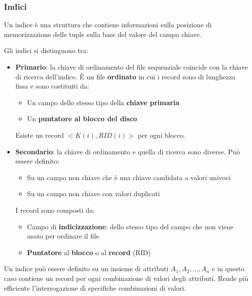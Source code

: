 \subsubsection{Indici}
\begin{definition}[Indice]
	Un indice è una struttura che contiene informazioni sulla posizione di memorizzazione delle tuple sulla base del valore del campo chiave.
\end{definition}
Gli indici  si distinguono tra:
\begin{itemize}
	\item \textbf{Primario}: la chiave di ordinamento del file sequenziale coincide con la chiave di ricerca dell'indice. È un file \textbf{ordinato} in cui i record sono di lunghezza fissa e sono costituiti da:
	\begin{itemize}
		\item Un campo dello stesso tipo della \textbf{chiave primaria}
		\item Un \textbf{puntatore al blocco del disco}
	\end{itemize}
	Esiste un record $<K(i), RID(i)>$ per ogni blocco.
	\item \textbf{Secondario}: la chiave di ordinamento e quella di ricerca sono diverse. Può essere definito:
	\begin{itemize}
		\item Su un campo non chiave che è una chiave candidata a valori univoci
		\item Su un campo non chiave con valori duplicati
	\end{itemize}
	I record sono composti da:
	\begin{itemize}
		\item Campo di \textbf{indicizzazione}: dello stesso tipo del campo che non viene usato per ordinare il file
		\item \textbf{Puntatore} al \textbf{blocco} o al \textbf{record} (RID)
	\end{itemize}
\end{itemize}
Un indice può essere definito su un insieme di attributi $A_1, A_2, \ldots, A_n$ e in questo caso contiene un record per ogni combinazione di valori degli attributi. Rende più efficiente l'interrogazione di specifiche combinazioni di valori.

